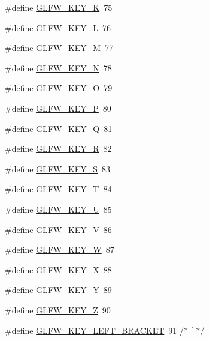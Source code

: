 \begin{DoxyCompactItemize}
\item 
\#define \hyperlink{group__keys_ga4ae8debadf6d2a691badae0b53ea3ba0}{G\+L\+F\+W\+\_\+\+K\+E\+Y\+\_\+\+K}~75
\item 
\#define \hyperlink{group__keys_gaaa8b54a13f6b1eed85ac86f82d550db2}{G\+L\+F\+W\+\_\+\+K\+E\+Y\+\_\+\+L}~76
\item 
\#define \hyperlink{group__keys_ga4d7f0260c82e4ea3d6ebc7a21d6e3716}{G\+L\+F\+W\+\_\+\+K\+E\+Y\+\_\+\+M}~77
\item 
\#define \hyperlink{group__keys_gae00856dfeb5d13aafebf59d44de5cdda}{G\+L\+F\+W\+\_\+\+K\+E\+Y\+\_\+\+N}~78
\item 
\#define \hyperlink{group__keys_gaecbbb79130df419d58dd7f09a169efe9}{G\+L\+F\+W\+\_\+\+K\+E\+Y\+\_\+\+O}~79
\item 
\#define \hyperlink{group__keys_ga8fc15819c1094fb2afa01d84546b33e1}{G\+L\+F\+W\+\_\+\+K\+E\+Y\+\_\+\+P}~80
\item 
\#define \hyperlink{group__keys_gafdd01e38b120d67cf51e348bb47f3964}{G\+L\+F\+W\+\_\+\+K\+E\+Y\+\_\+\+Q}~81
\item 
\#define \hyperlink{group__keys_ga4ce6c70a0c98c50b3fe4ab9a728d4d36}{G\+L\+F\+W\+\_\+\+K\+E\+Y\+\_\+\+R}~82
\item 
\#define \hyperlink{group__keys_ga1570e2ccaab036ea82bed66fc1dab2a9}{G\+L\+F\+W\+\_\+\+K\+E\+Y\+\_\+\+S}~83
\item 
\#define \hyperlink{group__keys_ga90e0560422ec7a30e7f3f375bc9f37f9}{G\+L\+F\+W\+\_\+\+K\+E\+Y\+\_\+\+T}~84
\item 
\#define \hyperlink{group__keys_gacad52f3bf7d378fc0ffa72a76769256d}{G\+L\+F\+W\+\_\+\+K\+E\+Y\+\_\+\+U}~85
\item 
\#define \hyperlink{group__keys_ga22c7763899ecf7788862e5f90eacce6b}{G\+L\+F\+W\+\_\+\+K\+E\+Y\+\_\+\+V}~86
\item 
\#define \hyperlink{group__keys_gaa06a712e6202661fc03da5bdb7b6e545}{G\+L\+F\+W\+\_\+\+K\+E\+Y\+\_\+\+W}~87
\item 
\#define \hyperlink{group__keys_gac1c42c0bf4192cea713c55598b06b744}{G\+L\+F\+W\+\_\+\+K\+E\+Y\+\_\+\+X}~88
\item 
\#define \hyperlink{group__keys_gafd9f115a549effdf8e372a787c360313}{G\+L\+F\+W\+\_\+\+K\+E\+Y\+\_\+\+Y}~89
\item 
\#define \hyperlink{group__keys_gac489e208c26afda8d4938ed88718760a}{G\+L\+F\+W\+\_\+\+K\+E\+Y\+\_\+\+Z}~90
\item 
\#define \hyperlink{group__keys_gad1c8d9adac53925276ecb1d592511d8a}{G\+L\+F\+W\+\_\+\+K\+E\+Y\+\_\+\+L\+E\+F\+T\+\_\+\+B\+R\+A\+C\+K\+E\+T}~91  /$\ast$ \mbox{[} $\ast$/

\end{DoxyCompactItemize}
